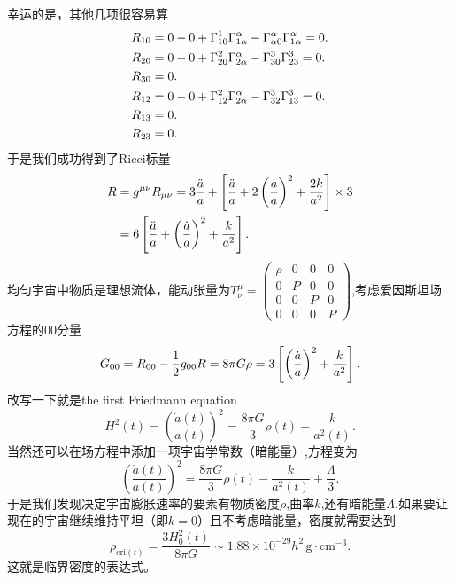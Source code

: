 \documentclass[../天体物理基础.tex]{subfiles}
\begin{document}
幸运的是，其他几项很容易算
\begin{align}
R_{10}&=0-0+\Gamma_{10}^{1}\Gamma_{1\alpha}^{\alpha}-\Gamma_{\alpha0}^{\alpha}\Gamma_{1\alpha}^{\alpha}=0.\notag\\
R_{20}&=0-0+\Gamma_{20}^{2}\Gamma_{2\alpha}^{\alpha}-\Gamma_{30}^{3}\Gamma_{23}^{3}=0.\notag\\
R_{30}&=0.\notag\\
R_{12}&=0-0+\Gamma_{12}^{2}\Gamma_{2\alpha}^{\alpha}-\Gamma_{32}^{3}\Gamma_{13}^{3}=0.\notag\\
R_{13}&=0.\notag\\
R_{23}&=0.\notag
\end{align}
于是我们成功得到了Ricci标量
\begin{align}
R&=g^{\mu\nu}R_{\mu\nu}=3\frac{\ddot a}{a}+\left[\frac{\ddot a}{a}+2\left(\frac{\dot a}{a}\right)^{2}+\frac{2k}{a^{2}}\right]\times3\notag\\
&=6\left[\frac{\ddot a}{a}+\left(\frac{\dot a}{a}\right)^{2}+\frac{k}{a^{2}}\right].\notag
\end{align}
均匀宇宙中物质是理想流体，能动张量为$T^{\mu}_{\nu}=\begin{pmatrix}
\rho & 0 & 0 & 0\\
0 & P & 0 & 0\\
0 & 0 & P & 0\\
0 & 0 & 0 & P
\end{pmatrix}$,考虑爱因斯坦场方程的00分量
\begin{equation}
G_{00}=R_{00}-\frac{1}{2}g_{00}R=8\pi G\rho=3\left[\left(\frac{\dot a}{a}\right)^{2}+\frac{k}{a^{2}}\right].\notag
\end{equation}
改写一下就是the first Friedmann equation
\begin{equation}
H^{2}\left(t\right)=\left(\frac{\dot{a}\left(t\right)}{a\left(t\right)}\right)^{2}=\frac{8\pi G}{3}\rho\left(t\right)-\frac{k}{a^{2}\left(t\right)}.
\end{equation}
当然还可以在场方程中添加一项宇宙学常数（暗能量）,方程变为
\begin{equation}
\left(\frac{\dot{a}\left(t\right)}{a\left(t\right)}\right)^{2}=\frac{8\pi G}{3}\rho\left(t\right)-\frac{k}{a^{2}\left(t\right)}+\frac{\Lambda}{3}.\label{1.6.8}
\end{equation}
于是我们发现决定宇宙膨胀速率的要素有物质密度$\rho$,曲率$k$,还有暗能量$\Lambda$.如果要让现在的宇宙继续维持平坦（即$k=0$）且不考虑暗能量，密度就需要达到
\begin{equation}
\rho_{\text{cri}\left(t\right)}=\frac{3H_{0}^{2}\left(t\right)}{8\pi G}\sim1.88\times10^{-29}h^{2}\,\mathrm{g\cdot{}cm^{-3}}.
\end{equation}
这就是临界密度的表达式。
\end{document}
